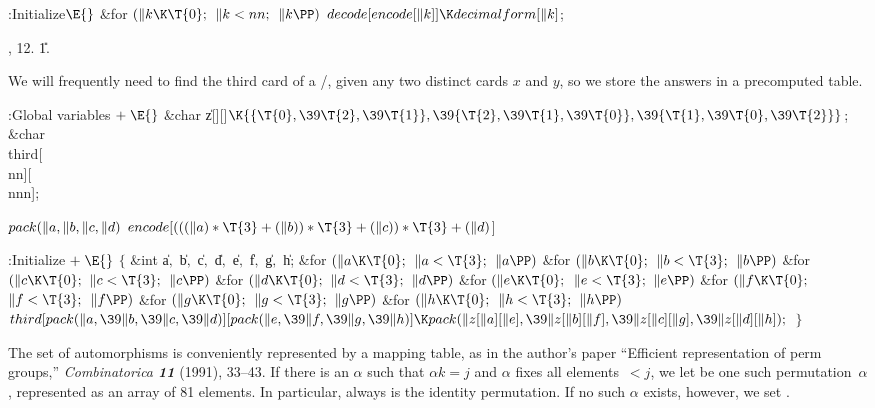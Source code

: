 \B{}:Initialize\X${}\E{}$\6
\&{for} ${}(\|k\K\T{0};{}$ ${}\|k<\\{nn};{}$ ${}\|k\PP){}$\1\5
${}\\{decode}[\\{encode}[\|k]]\K\\{decimalform}[\|k]{}$;\2\par
{}, 12.
\U1.\fi

We will frequently need to find the third card of a %
\SET/,
given any two distinct cards $x$ and $y$, so we store the answers
in a precomputed table.

\Y\B\4:Global variables\X${}\mathrel+\E{}$\6
\&{char} \|z[][]${}\K\{\{\T{0},\39\T{2},\39\T{1}\},\39\{\T{2},\39%
\T{1},\39\T{0}\},\39\{\T{1},\39\T{0},\39\T{2}\}\}{}$;\6
\&{char} \\{third}[\\{nn}][\\{nnn}];\par
\fi

\B\D$\\{pack}(\|a,\|b,\|c,\|d)$ \5
$\\{encode}[(((\|a)*\T{3}+(\|b))*\T{3}+(\|c))*\T{3}+(\|d){}$]\par
\Y\B\4:Initialize\X${}\mathrel+\E{}$\6
${}\{{}$\1\6
\&{int} \|a${},{}$ \|b${},{}$ \|c${},{}$ \|d${},{}$ \|e${},{}$ \|f${},{}$ %
\|g${},{}$ \|h;\7
\&{for} ${}(\|a\K\T{0};{}$ ${}\|a<\T{3};{}$ ${}\|a\PP){}$\1\6
\&{for} ${}(\|b\K\T{0};{}$ ${}\|b<\T{3};{}$ ${}\|b\PP){}$\1\6
\&{for} ${}(\|c\K\T{0};{}$ ${}\|c<\T{3};{}$ ${}\|c\PP){}$\1\6
\&{for} ${}(\|d\K\T{0};{}$ ${}\|d<\T{3};{}$ ${}\|d\PP){}$\1\6
\&{for} ${}(\|e\K\T{0};{}$ ${}\|e<\T{3};{}$ ${}\|e\PP){}$\1\6
\&{for} ${}(\|f\K\T{0};{}$ ${}\|f<\T{3};{}$ ${}\|f\PP){}$\1\6
\&{for} ${}(\|g\K\T{0};{}$ ${}\|g<\T{3};{}$ ${}\|g\PP){}$\1\6
\&{for} ${}(\|h\K\T{0};{}$ ${}\|h<\T{3};{}$ ${}\|h\PP){}$\1\5
${}\\{third}[\\{pack}(\|a,\39\|b,\39\|c,\39\|d)][\\{pack}(\|e,\39\|f,\39\|g,\39%
\|h)]\K\\{pack}(\|z[\|a][\|e],\39\|z[\|b][\|f],\39\|z[\|c][\|g],\39\|z[\|d][%
\|h]);{}$\2\2\2\2\2\2\2\2\6
\4${}\}{}$\2\par
\fi

The set of automorphisms is conveniently represented by
a mapping
table, as in the author's paper ``Efficient representation of
perm groups,'' {\sl Combinatorica\/ \bf11} (1991), 33--43.
If there is an $\alpha$ such that $\alpha k=j$ and $\alpha$ fixes
all elements~$<j$, we let  be one such permutation~$%
\alpha$,
represented as an array of 81 elements. In particular, 
always is
the identity permutation. If no such $\alpha$ exists, however, we set
.

